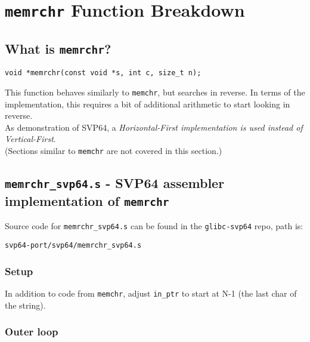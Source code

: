 %

\section{\texttt{memrchr} Function Breakdown}

\subsection{What is \texttt{memrchr}?}

\begin{verbatim}
void *memrchr(const void *s, int c, size_t n);
\end{verbatim}

This function behaves similarly to \texttt{memchr}, but searches in reverse.
In terms of the implementation, this requires a bit of additional arithmetic
to start looking in reverse.\\

As demonstration of \acrshort{SVP64}, a \textit{Horizontal-First implementation is used
instead of Vertical-First}.\\

(Sections similar to \texttt{memchr} are not covered in this section.)

\subsection{\texttt{memrchr\_svp64.s} - SVP64 assembler implementation of \texttt{memrchr}}

Source code for \texttt{memrchr\_svp64.s} can be found in the
\texttt{glibc-svp64} repo, path is:
\begin{verbatim}
svp64-port/svp64/memrchr_svp64.s
\end{verbatim}

\subsubsection{Setup}

In addition to code from \texttt{memchr}, adjust \texttt{in\_ptr}
to start at N-1 (the last char of the string).

\subsubsection{Outer loop}

